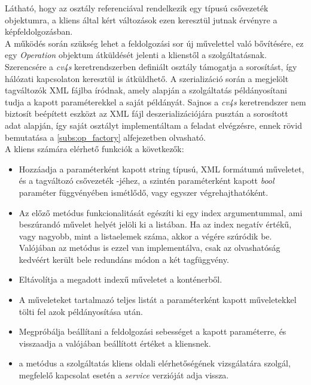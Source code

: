 Látható, hogy az osztály referenciával rendelkezik egy  típusú csővezeték objektumra, a kliens által kért változások ezen keresztül jutnak érvényre a képfeldolgozásban.\\
A működés során szükség lehet a feldolgozási sor új művelettel való bővítésére, ez egy \emph{Operation} objektum átküldését jelenti a klienstől a szolgáltatásnak. Szerencsére a \emph{cv4s} keretrendszerben definiált osztály támogatja a sorosítást, így hálózati kapcsolaton keresztül is átküldhető. A szerializáció során a megjelölt tagváltozók XML fájlba íródnak, amely alapján a szolgáltatás példányosítani tudja a kapott paraméterekkel a saját  példányát. Sajnos a \emph{cv4s} keretrendszer nem biztosít beépített eszközt az XML fájl deszerializációjára pusztán a sorosított adat alapján, így saját osztályt implementáltam a feladat elvégzésre, ennek rövid bemutatása a \ref{subs:op_factory} alfejezetben olvasható.\\
A kliens számára elérhető funkciók a következők:
\begin{itemize}
\item {} Hozzáadja a paraméterként kapott string típusú, XML formátumú műveletet, és a tagváltozó csővezeték -jéhez, a szintén paraméterként kapott \emph{bool} paraméter függvényében ismétlődő, vagy egyszer végrehajthatóként.
\item {} Az előző metódus funkcionalitását egészíti ki egy index argumentummal, ami beszúrandó művelet helyét jelöli ki a listában. Ha az index negatív értékű, vagy nagyobb, mint a listaelemek száma, akkor a végére szúródik be. Valójában az  metódus is ezzel van implementálva, csak az olvashatóság kedvéért került bele redundáns módon a két tagfüggvény.
\item {} Eltávolítja a megadott indexű műveletet a konténerből.
\item {} A műveleteket tartalmazó teljes listát a paraméterként kapott műveletekkel tölti fel azok példányosítása után.
\item {} Megpróbálja beállítani a feldolgozási sebességet a kapott paraméterre, és visszaadja a valójában beállított értéket a kliensnek.
\item {} a metódus a szolgáltatás kliens oldali elérhetőségének vizsgálatára szolgál, megfelelő kapcsolat esetén a \emph{service} verzióját adja vissza.
\end{itemize}

